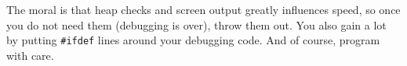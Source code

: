 The moral is that heap checks and screen output
greatly influences speed, so once you do not need them (debugging is
over), throw them out. You also gain a lot by putting \texttt{\#ifdef}
lines around your debugging code. And of course, program with care.


